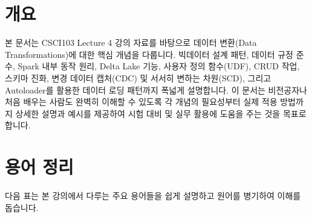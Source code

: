 \documentclass[11pt,a4paper]{article}
\theoremstyle{definition}
\begin{document}
\newpage
\section*{개요}
본 문서는 CSCI103 Lecture 4 강의 자료를 바탕으로 데이터 변환(Data Transformations)에 대한 핵심 개념을 다룹니다. 빅데이터 설계 패턴, 데이터 규정 준수, Spark 내부 동작 원리, Delta Lake 기능, 사용자 정의 함수(UDF), CRUD 작업, 스키마 진화, 변경 데이터 캡처(CDC) 및 서서히 변하는 차원(SCD), 그리고 Autoloader를 활용한 데이터 로딩 패턴까지 폭넓게 설명합니다. 이 문서는 비전공자나 처음 배우는 사람도 완벽히 이해할 수 있도록 각 개념의 필요성부터 실제 적용 방법까지 상세한 설명과 예시를 제공하여 시험 대비 및 실무 활용에 도움을 주는 것을 목표로 합니다.

\newpage
\section{용어 정리}
다음 표는 본 강의에서 다루는 주요 용어들을 쉽게 설명하고 원어를 병기하여 이해를 돕습니다.
\end{document}
